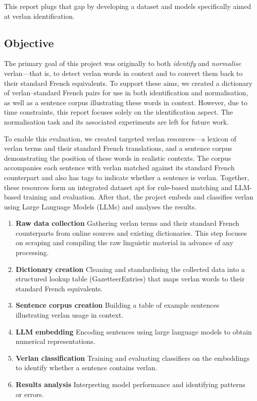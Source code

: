 \documentclass[12pt]{article}
\begin{document}
This report plugs that gap by developing a dataset and models specifically aimed at verlan identification.

\subsection{Objective}

The primary goal of this project was originally to both \textit{identify} and \textit{normalise} verlan\;---\;that is, to detect verlan words in context and to convert them back to their standard French equivalents. To support these aims, we created a dictionary of verlan--standard French pairs for use in both identification and normalisation, as well as a sentence corpus illustrating these words in context. However, due to time constraints, this report focuses solely on the identification aspect. The normalisation task and its associated experiments are left for future work.

To enable this evaluation, we created targeted verlan resources\;---\;a lexicon of verlan terms and their standard French translations, and a sentence corpus demonstrating the position of these words in realistic contexts. The corpus accompanies each sentence with verlan matched against its standard French counterpart and also has tags to indicate whether a sentence is verlan. Together, these resources form an integrated dataset apt for rule-based matching and LLM-based training and evaluation. After that, the project embeds and classifies verlan using Large Language Models (LLMs) and analyses the results.

\begin{enumerate}
  \item \textbf{Raw data collection} Gathering verlan terms and their standard French counterparts from online sources and existing dictionaries. This step focuses on scraping and compiling the raw linguistic material in advance of any processing.
  \item \textbf{Dictionary creation} Cleaning and standardising the collected data into a structured lookup table (GazetteerEntries) that maps verlan words to their standard French equivalents.
  \item \textbf{Sentence corpus creation} Building a table of example sentences illustrating verlan usage in context.
  \item \textbf{LLM embedding} Encoding sentences using large language models to obtain numerical representations.
  \item \textbf{Verlan classification} Training and evaluating classifiers on the embeddings to identify whether a sentence contains verlan.
  \item \textbf{Results analysis} Interpreting model performance and identifying patterns or errors.
\end{enumerate}
\end{document}

